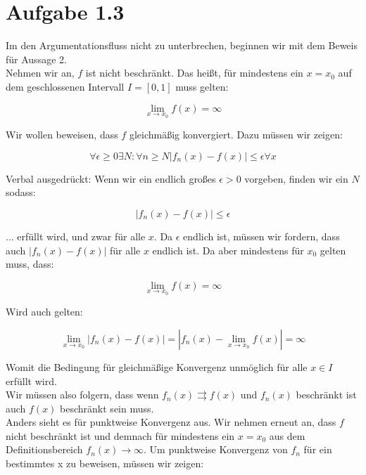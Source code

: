 \documentclass[a4paper,german,12pt,smallheadings]{scrartcl}
\begin{document}
\section*{Aufgabe 1.3}

Im den Argumentationsfluss nicht zu unterbrechen, beginnen wir mit dem Beweis für Aussage 2.\\
Nehmen wir an, $f$ ist nicht beschränkt. Das heißt, für mindestens ein $x=x_0$ auf dem geschlossenen Intervall $I=[0,1]$ muss gelten:

\begin{equation*}
\lim\limits_{x \to x_0} f(x)=\infty
\end{equation*}

 Wir wollen beweisen, dass $f$ gleichmäßig konvergiert. Dazu müssen wir zeigen:

\begin{equation*}
\forall \epsilon \ge 0 \exists N: \forall n \geq N |f_n(x)-f(x)| \le \epsilon \forall x
\end{equation*}

Verbal ausgedrückt: Wenn wir ein endlich großes $\epsilon>0$ vorgeben, finden wir ein $N$ sodass:

\begin{equation*}
|f_n(x)-f(x)| \le \epsilon 
\end{equation*}

... erfüllt wird, und zwar für alle $x$. Da $\epsilon$ endlich ist, müssen wir fordern, dass auch $|f_n(x)-f(x)|$ für alle $x$ endlich ist. Da aber mindestens für $x_0$ gelten muss, dass:

\begin{equation*}
\lim\limits_{x \to x_0} f(x)=\infty
\end{equation*}

Wird auch gelten:

\begin{equation*}
\lim\limits_{x \to x_0} |f_n(x)-f(x)|=|f_n(x)-\lim\limits_{x \to x_0} f(x)|=\infty
\end{equation*}

Womit die Bedingung für gleichmäßige Konvergenz unmöglich für alle $x \in I$ erfüllt wird.\\

Wir müssen also folgern, dass wenn $f_n(x) \rightrightarrows f(x)$ und $f_n(x)$ beschränkt ist auch $f(x)$ beschränkt sein muss.\\

Anders sieht es für punktweise Konvergenz aus. Wir nehmen erneut an, dass $f$ nicht beschränkt ist und demnach für mindestens ein $x=x_0$ aus dem Definitionsbereich $f_n(x) \rightarrow \infty$. 
Um punktweise Konvergenz von $f_n$ für ein bestimmtes x zu beweisen, müssen wir zeigen:
\end{document}
